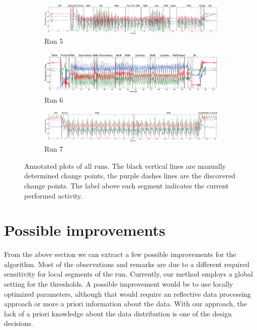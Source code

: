 \begin{figure}
  \begin{subfigure}{1\textwidth}
    \includegraphics[width=\textwidth]{./Figures/chapter6/data_collection/run-6-walk-run-roemer/data_plot_acc_with_discovered_cps.eps}
    \caption{Run 5}
    \label{fig:data_with_cps_run_5}
  \end{subfigure}

  \begin{subfigure}{1\textwidth}
    \includegraphics[width=\textwidth]{./Figures/chapter6/data_collection/stairs-1-marc/data_plot_acc_with_discovered_cps.eps}
    \caption{Run 6}
    \label{fig:data_with_cps_run_6}
  \end{subfigure}

  \begin{subfigure}{1\textwidth}
    \includegraphics[width=\textwidth]{./Figures/chapter6/data_collection/run-3-walk-turn-roemer/data_plot_acc_with_discovered_cps.eps}
    \caption{Run 7}
    \label{fig:data_with_cps_run_7}
  \end{subfigure}

  \caption[Results run 1/8]{Annotated plots of all runs. The black vertical lines are manually determined change points, the purple dashes lines are the discovered change points. The label above each segment indicates the current performed activity.}\label{fig:plots_all_runs_results}
\end{figure}


\section{Possible improvements}\label{sec:possible_improvements}
From the above section we can extract a few possible improvements for the algorithm.
Most of the observations and remarks are due to a different required sensitivity for local segments of the run.
Currently, our method employs a global setting for the thresholds.
A possible improvement would be to use locally optimized parameters, although that would require an reflective data processing approach or more a priori information about the data.
With our approach, the lack of a priori knowledge about the data distribution is one of the design decisions.

